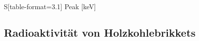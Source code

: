 \begin{table}
    \centering
    \label{tab:barium}
    \caption{Barium}
    \begin{tabular}{%
        S[table-format=3.1]%
    }
        \toprule
        {Peak [\si{keV}]} \\
        \midrule
        \bottomrule
    \end{tabular}
\end{table}

\subsection{Radioaktivität von Holzkohlebrikkets} %
\label{sub:holzkohle}


